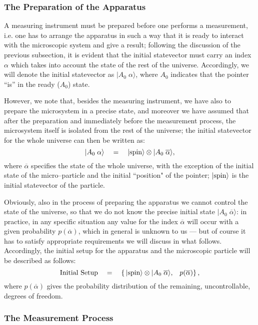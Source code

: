 \documentclass[12pt]{article}
\begin{document}
\subsubsection{The Preparation of the Apparatus} \label{sec223}

A measuring instrument must be prepared before one performs a
measurement, i.e. one has to arrange the apparatus in such a way
that it is ready to interact with the microscopic system and give
a result; following the discussion of the previous subsection, it
is evident that the initial statevector must carry an index
$\alpha$ which takes into account the state of the rest of the
universe. Accordingly, we will denote the initial statevector as
$|A_{0}\;\alpha\rangle$, where $A_{0}$ indicates that the pointer
``is'' in the ready ($A_{0}$) state.

However, we note that, besides the measuring instrument, we have
also to prepare the microsystem in a precise state, and moreover
we have assumed that after the preparation and immediately before
the measurement process, the microsystem itself is isolated from
the rest of the universe; the initial statevector for the whole
universe can then be written as:
\[
|A_{0}\;\alpha\rangle \quad =\quad
|\makebox{spin}\rangle\otimes|A_{0}\;\overline{\alpha}\rangle,
\]
where $\overline{\alpha}$ specifies the state of the whole
universe, with the exception of the initial state of the
micro--particle and the initial ``position" of the pointer;
$|\makebox{spin}\rangle$ is the initial statevector of the
particle.

Obviously, also in the process of preparing the apparatus we
cannot control the state of the universe, so that we do not know
the precise initial state $|A_{0}\;\overline{\alpha}\rangle$: in
practice, in any specific situation any value for the index
$\overline{\alpha}$ will occur with a given probability
$p(\overline{\alpha})$, which in general is unknown to us --- but
of course it has to satisfy appropriate requirements  we will
discuss in what follows. Accordingly, the initial setup for the
apparatus and the microscopic particle will be described as
follows:
\[ \makebox{Initial Setup} \quad =\quad \left\{\,
|\makebox{spin}\rangle\otimes|A_{0}\;\overline{\alpha}\rangle,
\;\;\; p(\overline{\alpha}) \right\},
\]
where $p(\overline{\alpha})$ gives the probability distribution of
the remaining, uncontrollable, degrees of freedom.


\subsubsection{The Measurement Process} \label{sec224}
\end{document}
